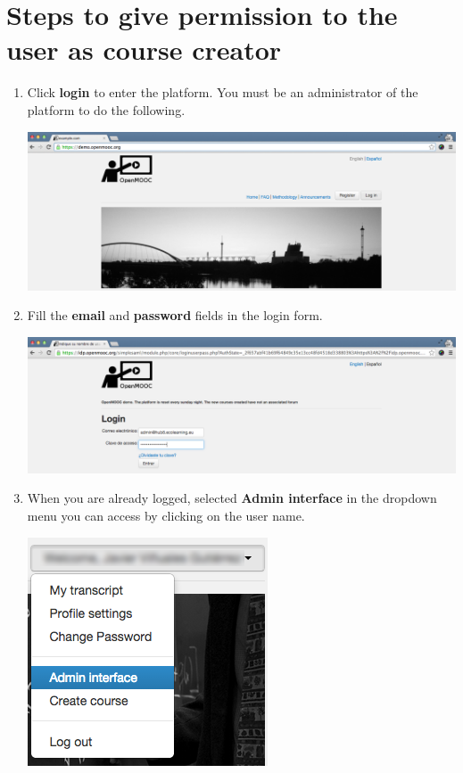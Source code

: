 \documentclass[letterpaper,10pt,english]{sphinxmanual}
\begin{document}
\section{Steps to give permission to the user as course creator}
\label{permission_to_create_a_course:steps-to-give-permission-to-the-user-as-course-creator}\begin{enumerate}
\item {} 
Click \textbf{login} to enter the platform. You must be an administrator of the platform to do the following.

\includegraphics{0_permission_to_create_a_course-1.png}

\item {} 
Fill the \textbf{email} and \textbf{password} fields in the login form.

\includegraphics{0_permission_to_create_a_course-2.png}

\item {} 
When you are already logged, selected \textbf{Admin interface} in the dropdown menu you can access by clicking on the user name.

\includegraphics{0_permission_to_create_a_course-3.png}


\end{enumerate}
\end{document}
